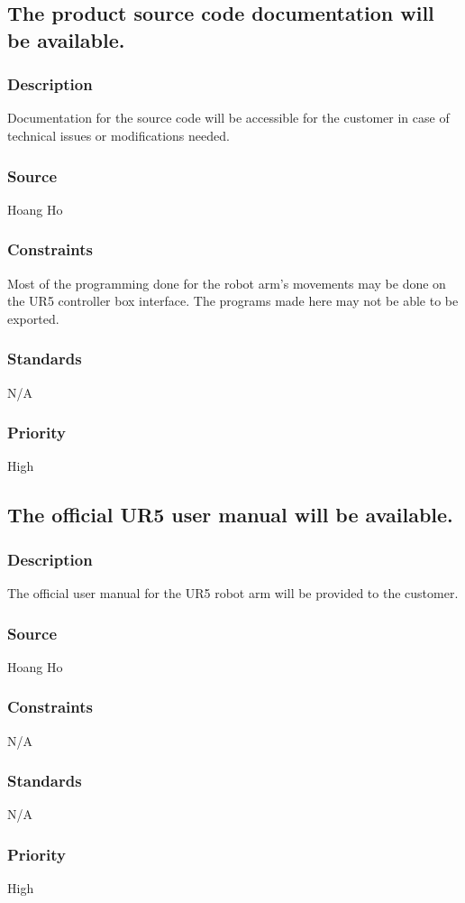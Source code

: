 \subsection{The product source code documentation will be available.}
\subsubsection{Description}
Documentation for the source code will be accessible for the customer in case of technical issues or modifications needed.
\subsubsection{Source}
Hoang Ho
\subsubsection{Constraints}
Most of the programming done for the robot arm's movements may be done on the UR5 controller box interface. The programs made here may not be able to be exported.
\subsubsection{Standards}
N/A
\subsubsection{Priority}
High

\subsection{The official UR5 user manual will be available.}
\subsubsection{Description}
The official user manual for the UR5 robot arm will be provided to the customer.
\subsubsection{Source}
Hoang Ho
\subsubsection{Constraints}
N/A
\subsubsection{Standards}
N/A
\subsubsection{Priority}
High
